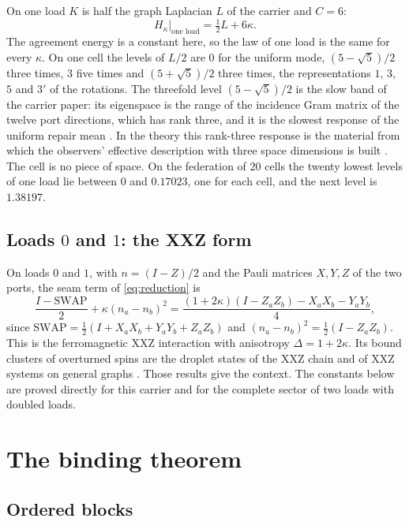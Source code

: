 \documentclass[11pt]{article}
\theoremstyle{definition}
\theoremstyle{remark}
\theoremstyle{plain}
\newcommand{\SWAP}{\mathrm{SWAP}}
\begin{document}
On one load $K$ is half the graph Laplacian $L$ of the carrier and $C=6$:
\begin{equation}
H_\kappa\big|_{\text{one load}}=\tfrac12L+6\kappa .
\label{eq:one-load}
\end{equation}
The agreement energy is a constant here, so the law of one load is the same
for every $\kappa$. On one cell the levels of $L/2$ are $0$ for the uniform
mode, $(5-\sqrt5)/2$ three times, $3$ five times and $(5+\sqrt5)/2$ three
times, the representations $1$, $3$, $5$ and $3'$ of the rotations. The
threefold level $(5-\sqrt5)/2$ is the slow band of the carrier paper: its
eigenspace is the range of the incidence Gram matrix of the twelve port
directions, which has rank three, and it is the slowest response of the
uniform repair mean \cite{ophmicro}. In the theory this rank-three response
is the material from which the observers' effective description with three
space dimensions is built \cite{ophspacetime}. The cell is no piece of
space. On the federation of $20$ cells the twenty lowest levels of one load
lie between $0$ and $0.17023$, one for each cell, and the next level is
$1.38197$.

\subsection{Loads \texorpdfstring{$0$ and $1$}{0 and 1}: the XXZ form}

On loads $0$ and $1$, with $n=(I-Z)/2$ and the Pauli matrices $X,Y,Z$ of
the two ports, the seam term of \eqref{eq:reduction} is
\begin{equation}
\frac{I-\SWAP}{2}+\kappa(n_a-n_b)^{2}
=\frac{(1+2\kappa)(I-Z_aZ_b)-X_aX_b-Y_aY_b}{4},
\label{eq:xxz}
\end{equation}
since $\SWAP=\tfrac12(I+X_aX_b+Y_aY_b+Z_aZ_b)$ and
$(n_a-n_b)^{2}=\tfrac12(I-Z_aZ_b)$. This is the ferromagnetic XXZ interaction
with anisotropy $\Delta=1+2\kappa$. Its bound clusters of overturned spins
are the droplet states of the XXZ chain \cite{nachtergaele2001} and of XXZ
systems on general graphs \cite{fischbacher2018}. Those results give the
context. The constants below are proved directly for this carrier and for
the complete sector of two loads with doubled loads.


\section{The binding theorem}
\label{sec:theorem}

\subsection{Ordered blocks}
\end{document}
